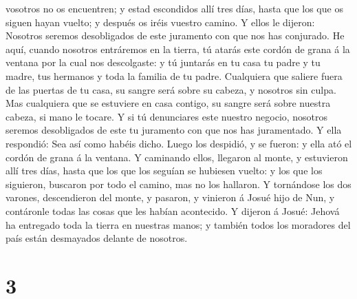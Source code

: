 vosotros no os encuentren; y estad escondidos allí tres días, hasta que
los que os siguen hayan vuelto; y después os iréis vuestro camino.
 Y ellos le dijeron: Nosotros seremos desobligados de este
juramento con que nos has conjurado.  He aquí, cuando
nosotros entráremos en la tierra, tú atarás este cordón de grana á la
ventana por la cual nos descolgaste: y tú juntarás en tu casa tu padre y
tu madre, tus hermanos y toda la familia de tu padre. 
Cualquiera que saliere fuera de las puertas de tu casa, su sangre será
sobre su cabeza, y nosotros sin culpa. Mas cualquiera que se estuviere
en casa contigo, su sangre será sobre nuestra cabeza, si mano le tocare.
 Y si tú denunciares este nuestro negocio, nosotros seremos
desobligados de este tu juramento con que nos has juramentado.
 Y ella respondió: Sea así como habéis dicho. Luego los
despidió, y se fueron: y ella ató el cordón de grana á la ventana.
 Y caminando ellos, llegaron al monte, y estuvieron allí
tres días, hasta que los que los seguían se hubiesen vuelto: y los que
los siguieron, buscaron por todo el camino, mas no los hallaron.
 Y tornándose los dos varones, descendieron del monte, y
pasaron, y vinieron á Josué hijo de Nun, y contáronle todas las cosas
que les habían acontecido.  Y dijeron á Josué: Jehová ha
entregado toda la tierra en nuestras manos; y también todos los
moradores del país están desmayados delante de nosotros.

\hypertarget{section-2}{%
\section{3}\label{section-2}}

